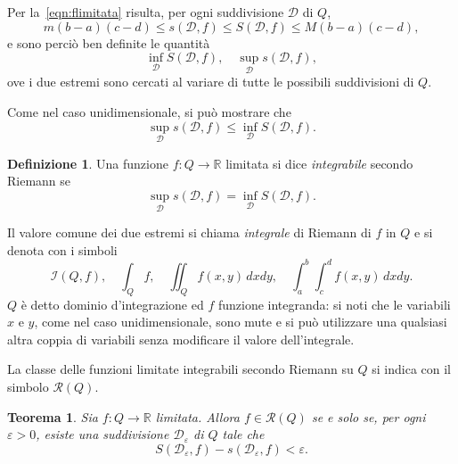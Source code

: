 \documentclass[a4paper]{book}
\numberwithin{equation}{section}
\renewcommand{\epsilon}{\varepsilon}
\theoremstyle{plain}
\newtheorem{teor}{Teorema}[section]
\theoremstyle{definition}
\newtheorem{defn}{Definizione}[section]
\theoremstyle{remark}
\theoremstyle{example}
\begin{document}
		Per la~\eqref{eqn:flimitata} risulta, per ogni suddivisione $\mathcal{D}$ di $Q$,
		\begin{equation*}
			m(b -a )(c-d) \le s(\mathcal{D}, f) \le S(\mathcal{D}, f) \le M(b-a)(c-d),
		\end{equation*}
		e sono perciò ben definite le quantità
		\begin{equation*}
			\inf_{\mathcal{D}}S(\mathcal{D}, f), \quad \sup_{\mathcal{D}}s(\mathcal{D}, f),
		\end{equation*}
		ove i due estremi sono cercati al variare di tutte le possibili suddivisioni di $Q$.

		Come nel caso unidimensionale, si può mostrare che
		\begin{equation*}
			\sup_{\mathcal{D}} s(\mathcal{D}, f) \le \inf_{\mathcal{D}} S(\mathcal{D}, f).
		\end{equation*}

		\begin{defn}
			Una funzione $f \colon Q \to \mathbb{R}$ limitata si dice \emph{integrabile} secondo Riemann se
			\begin{equation*}
				\sup_{\mathcal{D}} s(\mathcal{D}, f) = \inf_{\mathcal{D}} S(\mathcal{D}, f).
			\end{equation*}
		\end{defn}

		Il valore comune dei due estremi si chiama \emph{integrale} di Riemann di $f$ in $Q$ e si denota con i simboli
		\begin{equation*}
			\mathcal{I}(Q, f), \quad \int_Q f, \quad \iint_Q f(x,y)\, dxdy, \quad \int_a^b \int_c^d f(x,y) \, dxdy.
		\end{equation*}
		$Q$ è detto dominio d'integrazione ed $f$ funzione integranda: si noti che le variabili $x$ e $y$, come nel caso unidimensionale, sono mute e si può utilizzare una qualsiasi altra coppia di variabili senza modificare il valore dell'integrale.

		La classe delle funzioni limitate integrabili secondo Riemann su $Q$ si indica con il simbolo $\mathcal{R}(Q)$.

		\begin{teor}
			Sia $f \colon Q \to \mathbb{R}$ limitata. Allora $f \in \mathcal{R}(Q)$ se e solo se, per ogni $\epsilon > 0$, esiste una suddivisione $\mathcal{D}_{\epsilon}$ di $Q$ tale che
			\begin{equation}
				S(\mathcal{D}_{\epsilon}, f) - s(\mathcal{D}_{\epsilon}, f) < \epsilon.
			\end{equation}
		\end{teor}
\end{document}
